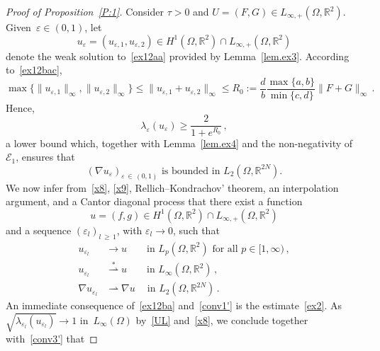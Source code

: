 \documentclass[AHL,Unicode,longabstracts,published]{cedram}
\newcommand{\bbR}{\mathbb{R}}
\newcommand{\clE}{\mathcal{E}}
\newcommand{\clE}{\mathcal{E}}
\begin{document}
\begin{proof}[Proof of Proposition~\ref{P:1}]
Consider $\tau>0$ and $U=(F,G)\in L_{\infty,+}(\Omega,\bbR^2)$. Given~$\varepsilon\in (0,1)$, let
\begin{equation*}
u_\varepsilon =(u_{\varepsilon,1},u_{\varepsilon,2}) \in H^1\left(\Omega,\bbR^2\right)\cap L_{\infty,+}\left(\Omega,\bbR^2\right)
\end{equation*}
denote the weak solution to~\eqref{ex12aa} provided by Lemma~\ref{lem.ex3}. According to~\eqref{ex12bac},
\begin{equation}\label{x8}
\max\{\|u_{\varepsilon,1}\|_\infty, \| u_{\varepsilon,2}\|_\infty \} \le\|u_{\varepsilon,1}+ u_{\varepsilon,2}\|_\infty \le R_0 := \frac{d}{b} \frac{\max\{a,b\}}{\min\{c,d\}} \|F+G\|_\infty\,. 
\end{equation}
Hence,
\begin{equation*}
\lambda_\varepsilon(u_\varepsilon) \ge \frac{2}{1+e^{R_0}}\,,
\end{equation*}
a lower bound which, together with Lemma~\ref{lem.ex4} and the non-negativity of $\clE_1$, ensures that
\begin{equation}\label{x9}
(\nabla u_{\varepsilon})_{\varepsilon\,\in\,(0,1)} \text{ is bounded in }L_2\left(\Omega,\bbR^{2N}\right). 
\end{equation}
We now infer from~\eqref{x8}, \eqref{x9}, Rellich--Kondrachov' theorem, an interpolation argument, and a Cantor diagonal process that there exist a function
\begin{equation*}
u=(f,g)\in H^1\left(\Omega,\bbR^2\right)\cap L_{\infty,+}\left(\Omega,\bbR^2\right)
\end{equation*}
and a sequence $(\varepsilon_l)_{l\,\ge\,1}$, with $\varepsilon_l\to 0$, such that
\begin{align}
u_{\varepsilon_l}&\to u\qquad\text{in }L_p\left(\Omega,\bbR^2\right)\text{ for all }p\in [1,\infty)\,,\label{conv1'}
\\[1ex] u_{\varepsilon_l}&\overset{*}\rightharpoonup u\qquad \text{in }L_\infty\left(\Omega,\bbR^2\right)\,,\label{conv2'}
\\[1ex]
\nabla u_{\varepsilon_l}&\rightharpoonup \nabla u\quad\: \text{in }L_2\left(\Omega,\bbR^{2N}\right)\,.\label{conv3'}
\end{align}
An immediate consequence of~\eqref{ex12ba} and~\eqref{conv1'} is the estimate~\eqref{ex2}. As~${\sqrt{\lambda_{\varepsilon_l}(u_{\varepsilon_l})}\to \!1}$ in~${L_\infty(\Omega)}$ by~\eqref{UL} and~\eqref{x8}, we conclude together with~\eqref{conv3'} that

\end{proof}
\end{document}
